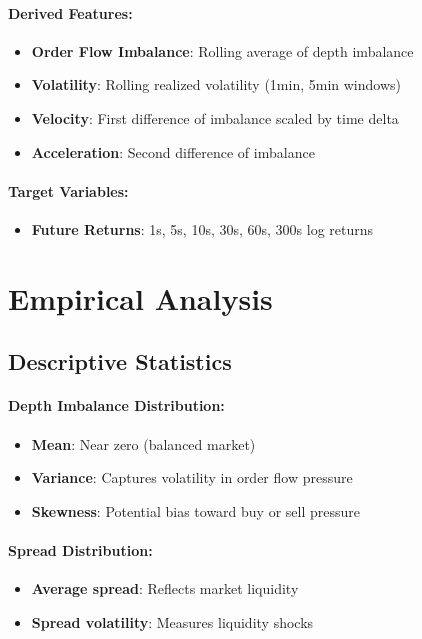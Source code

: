 \documentclass[12pt,a4paper]{article}
\begin{document}
\paragraph{Derived Features:}
\begin{itemize}
    \item \textbf{Order Flow Imbalance}: Rolling average of depth imbalance
    \item \textbf{Volatility}: Rolling realized volatility (1min, 5min windows)
    \item \textbf{Velocity}: First difference of imbalance scaled by time delta
    \item \textbf{Acceleration}: Second difference of imbalance
\end{itemize}

\paragraph{Target Variables:}
\begin{itemize}
    \item \textbf{Future Returns}: 1s, 5s, 10s, 30s, 60s, 300s log returns
\end{itemize}

\section{Empirical Analysis}

\subsection{Descriptive Statistics}

\paragraph{Depth Imbalance Distribution:}
\begin{itemize}
    \item \textbf{Mean}: Near zero (balanced market)
    \item \textbf{Variance}: Captures volatility in order flow pressure
    \item \textbf{Skewness}: Potential bias toward buy or sell pressure
\end{itemize}

\paragraph{Spread Distribution:}
\begin{itemize}
    \item \textbf{Average spread}: Reflects market liquidity
    \item \textbf{Spread volatility}: Measures liquidity shocks
\end{itemize}
\end{document}

